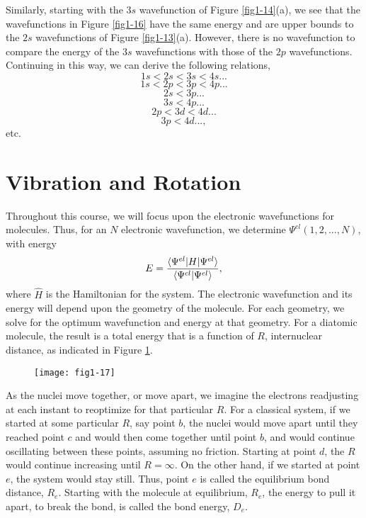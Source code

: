 Similarly, starting with the $3s$ wavefunction of Figure
\ref{fig1-14}(a), we see that the wavefunctions in Figure
\ref{fig1-16} have the same energy and are upper bounds to the $2s$
wavefunctions of Figure \ref{fig1-13}(a). However, there is no
wavefunction to compare the energy of the $3s$ wavefunctions with
those of the $2p$ wavefunctions. Continuing in this way, we can derive
the following relations,
$$
1s < 2s < 3s < 4s...
$$
$$
1s < 2p < 3p < 4p...
$$
$$
2s < 3p...
$$
$$
3s < 4p...
$$
$$
2p < 3d < 4d...
$$
$$
3p < 4d ... ,
$$
etc.

\section{Vibration and Rotation}
    
Throughout this course, we will focus upon the electronic wavefunctions for
molecules. Thus, for an $N$ electronic wavefunction, we determine 
$\Psi^{el}(1 , 2 , ... , N)$, with energy
\begin{equation}
E = {\langle \Psi^{el} \vert H \vert \Psi^{el} \rangle \over \langle \Psi^{cl} \vert 
\Psi^{el} \rangle},
\end{equation}
where ${\hat H}$ is the Hamiltonian for the system. The electronic 
wavefunction and its energy will depend upon the geometry of the molecule. For 
each geometry, we solve for the optimum wavefunction and energy at that 
geometry. For a diatomic molecule, the result is a total energy that is a 
function of $R$, internuclear distance, as indicated in Figure \ref{fig1-17}.

\begin{figure}
\begin{center}
\texttt{[image: fig1-17]}
\end{center}
\caption{}
\label{fig1-17}
\end{figure}
    
As the nuclei move together, or move apart, we imagine the electrons
readjusting at each instant to reoptimize for that particular $R$. For
a classical system, if we started at some particular $R$, say point
$b$, the nuclei would move apart until they reached point $c$ and
would then come together until point $b$, and would continue
oscillating between these points, assuming no friction. Starting at
point $d$, the $R$ would continue increasing until $R = \infty$. On
the other hand, if we started at point $e$, the system would stay
still. Thus, point $e$ is called the equilibrium bond distance,
$R_e$. Starting with the molecule at equilibrium, $R_e$, the energy to
pull it apart, to break the bond, is called the bond energy, $D_e$.
    
